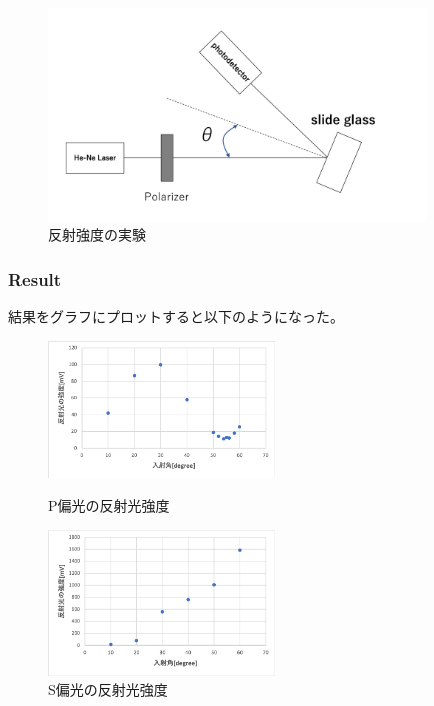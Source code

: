 \documentclass[11pt, a4paper]{jsarticle}
\begin{document}
\begin{figure}[htbp]
 \begin{center}
  \includegraphics[width=100mm]{fig19.png}
 \end{center}
 \caption{反射強度の実験}
 \label{fig:19}
\end{figure}

\subsubsection{Result}
結果をグラフにプロットすると以下のようになった。

\begin{figure}[htbp]
 \begin{minipage}{0.45\hsize}
  \begin{center}
   \includegraphics[width=60mm]{fig20.png}
  \end{center}
  \caption{P偏光の反射光強度}
  \label{fig:20}
 \end{minipage}
 \begin{minipage}{0.45\hsize}
  \begin{center}
   \includegraphics[width=60mm]{fig21.png}
  \end{center}
  \caption{S偏光の反射光強度}
  \label{fig:21}
 \end{minipage}
\end{figure}
\end{document}
